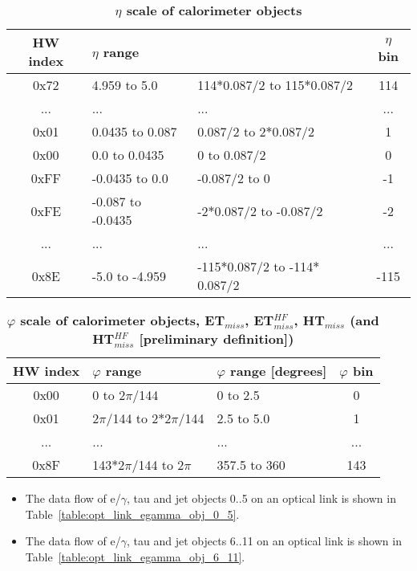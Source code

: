 \documentclass{cmspaper}
\begin{document}
\begin{table}[ht]
\caption{\bf $\eta$ scale of calorimeter objects}
\vspace{5mm}
\centering
\begin{tabular}{|c|l|l|c|}\hline
HW index & $\eta$ range &  & $\eta$ bin \\\hline\hline
0x72 & 4.959 to 5.0 & 114$*$0.087/2 to 115$*$0.087/2 & 114\\\hline
... & ... & ... & ...\\\hline
0x01 & 0.0435 to 0.087 & 0.087/2 to 2$*$0.087/2 & 1\\\hline
0x00 & 0.0 to 0.0435 & 0 to 0.087/2 & 0\\\hline
0xFF & -0.0435 to 0.0 & -0.087/2 to 0 & -1\\\hline
0xFE & -0.087 to -0.0435  & -2$*$0.087/2 to -0.087/2 & -2\\\hline
... & ... & ... & ...\\\hline
0x8E & -5.0 to -4.959 & -115$*$0.087/2 to -114$*$0.087/2 & -115\\\hline
\end{tabular}
\label{table:calo_eta_scale}
\end{table}

\begin{table}[ht]
\caption{\bf $\varphi$ scale of calorimeter objects, ET$_{miss}$, ET$_{miss}^{HF}$, HT$_{miss}$ (and HT$_{miss}^{HF}$ [preliminary definition])}
\vspace{5mm}
\centering
\begin{tabular}{|c|l|l|c|}\hline
HW index & $\varphi$ range & $\varphi$ range [degrees] & $\varphi$ bin\\\hline\hline
0x00 & 0 to 2$\pi$/144 & 0 to 2.5 & 0\\\hline
0x01 & 2$\pi$/144 to 2$*$2$\pi$/144 & 2.5 to 5.0 & 1\\\hline
... & ... & ... & ...\\\hline
0x8F & 143$*$2$\pi$/144 to 2$\pi$ & 357.5 to 360 & 143\\\hline
\end{tabular}
\label{table:calo_phi_scale}
\end{table}

\clearpage

\begin{itemize}
\item The data flow of e/$\gamma$, tau and jet objects 0..5 on an optical link is shown in Table~\ref{table:opt_link_egamma_obj_0_5}.
\item The data flow of e/$\gamma$, tau and jet objects 6..11 on an optical link is shown in Table~\ref{table:opt_link_egamma_obj_6_11}.
\end{itemize}
\end{document}
